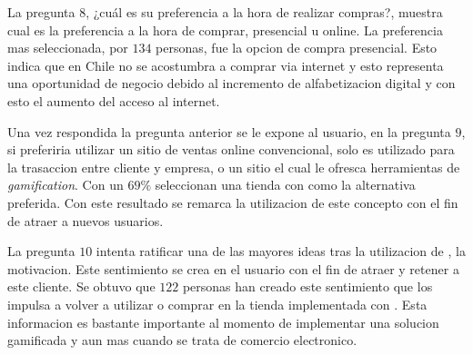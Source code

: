 

La pregunta $8$, ¿cuál es su preferencia a la hora de realizar compras?, muestra cual es la preferencia 
a la hora de comprar, presencial u online. La preferencia mas seleccionada, por $134$ personas, 
fue la opcion de compra presencial. Esto indica que en Chile no se acostumbra a comprar via internet 
y esto representa una oportunidad de negocio debido al incremento de alfabetizacion digital y 
con esto el aumento del acceso al internet.


Una vez respondida la pregunta anterior se le expone al usuario, en la pregunta $9$, si preferiria
utilizar un sitio de ventas online convencional, solo es utilizado para la trasaccion entre cliente
y empresa, o un sitio el cual le ofresca herramientas de \emph{gamification}. Con un $69\%$ seleccionan
una tienda con {\GAM} como la alternativa preferida. Con este resultado se remarca la
utilizacion de este concepto con el fin de atraer a nuevos usuarios.


La pregunta $10$ intenta ratificar una de las mayores ideas tras la utilizacion de {\GAM},
la motivacion. Este sentimiento se crea en el usuario con el fin de atraer y retener a este cliente.
 Se obtuvo que $122$ personas han creado este sentimiento que los impulsa a volver a utilizar o comprar 
en la tienda implementada con {\GAM}. Esta informacion es bastante importante al momento de implementar
una solucion gamificada y aun mas cuando se trata de comercio electronico.

